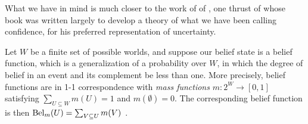




What we have in mind is much closer to the work of 
of \citeauthor{shafer1976mathematical}, one thrust of
whose \citeyear{shafer1976mathematical} book was written largely to
develop a theory of what we have been calling confidence,
for his preferred representation of uncertainty. 

\begin{example} \label{ex:shafer}
Let $W$ be a finite set of possible worlds, 
and suppose our belief state is a 
belief function, 
which is a generalization of a probability over $W$, 
in which the degree of belief in an event and its complement be less than one.
More precisely, belief functions are in 1-1 correspondence with
\emph{mass functions} $m : 2^W \! \to\! [0,1]$
satisfying $\sum_{U \subseteq W} m(U) \!=\! 1$ 
and $m(\emptyset) \!=\! 0$. 
The corresponding belief function is then
$\mathrm{Bel}_m(U) = \sum_{V \subseteq U} m(V)$
\parencite{shafer1976mathematical}.
%


\end{example}

